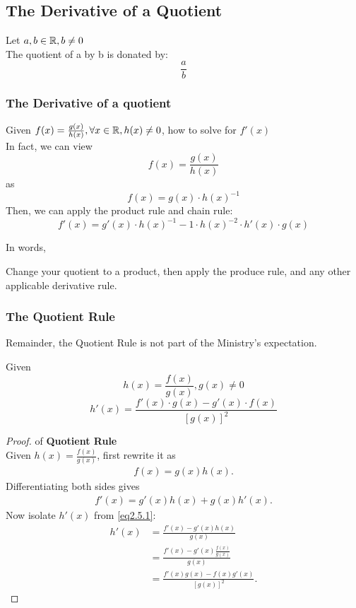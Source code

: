 \subsection{The Derivative of a Quotient}
\begin{definition}
     Let $a,b \in \mathbb{R}, b \neq 0$\\
    The quotient of a by b is donated by:$$\frac{a}{b}$$
\end{definition}

\subsubsection{The Derivative of a quotient}
Given $f(x) = \frac{g(x)}{h(x)}, \forall x \in \mathbb{R}, h(x) \neq 0$, how to solve for $f'(x)$\\
In fact, we can view $$f(x) = \frac{g(x)}{h(x)}$$ as $$f(x) = g(x) \cdot h(x)^{-1}$$
Then, we can apply the product rule and chain rule:
$$f'(x) = g'(x)\cdot h(x)^{-1} - 1\cdot h(x) ^{-2} \cdot h'(x) \cdot g(x)$$

In words, 
\begin{center}
    Change your quotient to a product, then apply the produce rule, and any other applicable derivative rule. 
\end{center}

\subsubsection{The Quotient Rule}
\begin{remark}
    Remainder, the Quotient Rule is not part of the Ministry's expectation. 
\end{remark}
\begin{definition}
     Given $$h(x) = \frac{f(x)}{g(x)}, g(x) \neq 0$$
    $$h'(x) = \frac{f'(x) \cdot g(x) - g'(x) \cdot f(x)}{\left [ g(x)\right ]^2}$$
\end{definition}

\begin{proof}
    of \textbf{Quotient Rule}\\

    Given \( h(x)=\frac{f(x)}{g(x)} \), first rewrite it as
    \begin{align}
        f(x)=g(x)h(x).
    \end{align}
    Differentiating both sides gives
    \begin{align}
        f'(x)=g'(x)h(x)+g(x)h'(x). \label{eq2.5.1}
    \end{align}
    Now isolate \( h'(x) \) from \eqref{eq2.5.1}:
    \begin{align}
        h'(x)
        &= \frac{f'(x)-g'(x)h(x)}{g(x)} \\
        &= \frac{f'(x)-g'(x)\frac{f(x)}{g(x)}}{g(x)} \\
        &= \frac{f'(x)g(x)-f(x)g'(x)}{[g(x)]^2}. \label{eq2.5.2}
    \end{align}

\end{proof}